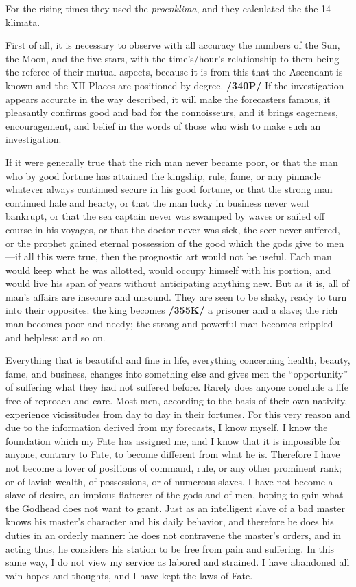 For the rising times they used the \textit{proenklima}, and they calculated the the 14 klimata.

First of all, it is necessary to observe with all accuracy the numbers of the Sun, the Moon, and the five stars, with the time’s/hour’s relationship to them being the referee of their mutual aspects, because it is from this that the Ascendant is known and the XII Places are positioned by degree. \textbf{/340P/} If the investigation appears accurate in the way described, it will make the forecasters famous, it pleasantly confirms good and bad for the connoisseurs, and it brings eagerness, encouragement, and belief in the words of those who wish to make such an investigation.

If it were generally true that the rich man never became poor, or that the man who by good fortune has attained the kingship, rule, fame, or any pinnacle whatever always continued secure in his good fortune, or
that the strong man continued hale and hearty, or that the man lucky in business never went bankrupt, or that the sea captain never was swamped by waves or sailed off course in his voyages, or that the doctor never was sick, the seer never suffered, or the prophet gained eternal possession of the good which the gods give to men—if all this were true, then the prognostic art would not be useful. Each man would keep what he was allotted, would occupy himself with his portion, and would live his span of years without anticipating anything new. But as it is, all of man’s affairs are insecure and unsound. They are seen to be shaky, ready to turn into their opposites: the king becomes \textbf{/355K/} a prisoner and a slave; the rich man becomes poor and needy; the strong and powerful man becomes crippled and helpless; and so on.

Everything that is beautiful and fine in life, everything concerning health, beauty, fame, and business, changes into something else and gives men the “opportunity” of suffering what they had not suffered before. Rarely does anyone conclude a life free of reproach and care. Most men, according to the basis of their own nativity, experience vicissitudes from day to day in their fortunes. For this very reason and due to the information derived from my forecasts, I know myself, I know the foundation which my Fate has assigned me, and I know that it is impossible for anyone, contrary to Fate, to become different from what he is. Therefore I have not become a lover of positions of command, rule, or any other prominent rank; or of lavish wealth, of possessions, or of numerous slaves. I have not become a slave of desire, an impious flatterer of the gods and of men, hoping to gain what the Godhead does not want to grant. Just as an intelligent slave of a bad master knows his master’s character and his daily behavior,
and therefore he does his duties in an orderly manner: he does not contravene the master’s orders, and in acting thus, he considers his station to be free from pain and suffering. In this same way, I do not view my service as labored and strained. I have abandoned all vain hopes and thoughts, and I have kept the laws of Fate.

